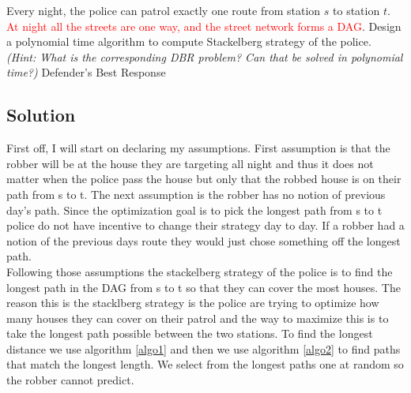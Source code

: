 \documentclass[11pt]{article}
\begin{document}
\begin{enumerate}
Every night, the police can patrol exactly one route from station $s$ to station $t$. \textcolor{red}{At night all the streets are one way, and the street network forms a DAG}. Design a polynomial time algorithm to compute Stackelberg strategy of the police. \\

{\em (Hint: What is the corresponding DBR problem? Can that be solved in polynomial time?)}
Defender's Best Response
\subsection{Solution}
First off, I will start on declaring my assumptions. First assumption is that the robber will be at the house they are targeting all night and thus it does not matter when the police pass the house but only that the robbed house is on their path from s to t. The next assumption is the robber has no notion of previous day's path. Since the optimization goal is to pick the longest path from s to t police do not have incentive to change their strategy day to day. If a robber had a notion of the previous days route they would just chose something off the longest path. \\
Following those assumptions the stackelberg strategy of the police is to find the longest path in the DAG from s to t so that they can cover the most houses. The reason this is the stacklberg strategy is the police are trying to optimize how many houses they can cover on their patrol and the way to maximize this is to take the longest path possible between the two stations. To find the longest distance we use algorithm \ref{algo1} and then we use algorithm  \ref{algo2} to find paths that match the longest length. We select from the longest paths one at random so the robber cannot predict. \\
\begin{algorithm}[H]
\SetAlgoLined
{}
\hspace*{\algorithmicindent} \textbf{Input:}Weighted DAG G = (V,E) \\
\hspace*{\algorithmicindent} \textbf{Output:} Largest path cost in G \\
Topologically sort G \\
 {
    $dist(v) = max_{(u,v) \in E} \{dist(u) + w(u,v)$\} }
\textbf{return} $max_{v \in V} \{dist(v)}$
 

\end{algorithm}
\end{enumerate}
\end{document}
